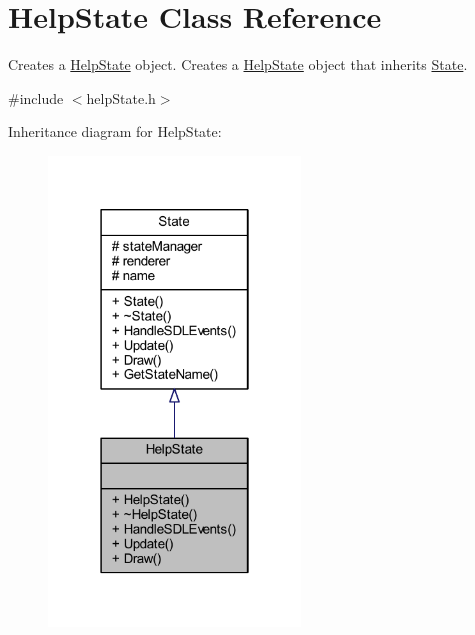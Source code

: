 \hypertarget{class_help_state}{\section{Help\+State Class Reference}
\label{class_help_state}
}


Creates a \hyperlink{class_help_state}{Help\+State} object. Creates a \hyperlink{class_help_state}{Help\+State} object that inherits \hyperlink{class_state}{State}.  




{\ttfamily \#include $<$help\+State.\+h$>$}



Inheritance diagram for Help\+State\+:
\nopagebreak
\begin{figure}[H]
\begin{center}
\leavevmode
\includegraphics[width=190pt]{class_help_state__inherit__graph}
\end{center}
\end{figure}


